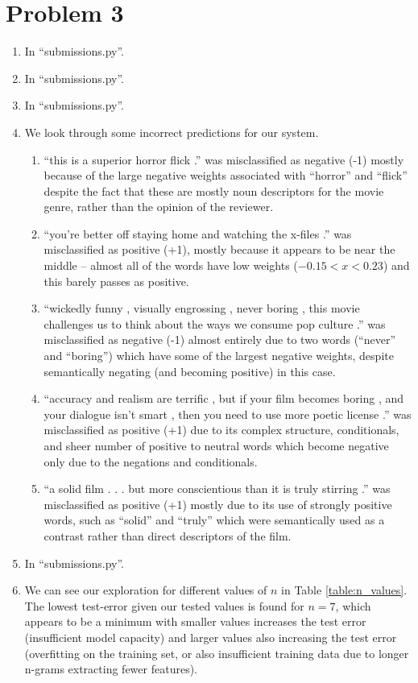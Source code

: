 \documentclass[12pt]{article}
\begin{document}
\section*{Problem 3}

\begin{enumerate}[label=(\alph*)]
  \item In ``submissions.py''.
  \item In ``submissions.py''.
  \item In ``submissions.py''.
  \item We look through some incorrect predictions for our system.
  \begin{enumerate}
    \item ``this is a superior horror flick .'' was misclassified as negative (-1) mostly because of the large negative weights associated with ``horror'' and ``flick'' despite the fact that these are mostly noun descriptors for the movie genre, rather than the opinion of the reviewer.
    \item ``you're better off staying home and watching the x-files .'' was misclassified as positive (+1), mostly because it appears to be near the middle -- almost all of the words have low weights ($-0.15 < x <0.23$) and this barely passes as positive.
    \item ``wickedly funny , visually engrossing , never boring , this movie challenges us to think about the ways we consume pop culture .'' was misclassified as negative (-1) almost entirely due to two words (``never'' and ``boring'') which have some of the largest negative weights, despite semantically negating (and becoming positive) in this case.
    \item ``accuracy and realism are terrific , but if your film becomes boring , and your dialogue isn't smart , then you need to use more poetic license .'' was misclassified as positive (+1) due to its complex structure, conditionals, and sheer number of positive to neutral words which become negative only due to the negations and conditionals.
    \item ``a solid film . . . but more conscientious than it is truly stirring .'' was misclassified as positive (+1) mostly due to its use of strongly positive words, such as ``solid'' and ``truly'' which were semantically used as a contrast rather than direct descriptors of the film.
  \end{enumerate}
  \item In ``submissions.py''.
  \item We can see our exploration for different values of $n$ in Table \ref{table:n_values}. The lowest test-error given our tested values is found for $n= 7$, which appears to be a minimum with smaller values increases the test error (insufficient model capacity) and larger values also increasing the test error (overfitting on the training set, or also insufficient training data due to longer n-grams extracting fewer features).


\end{enumerate}
\end{document}
